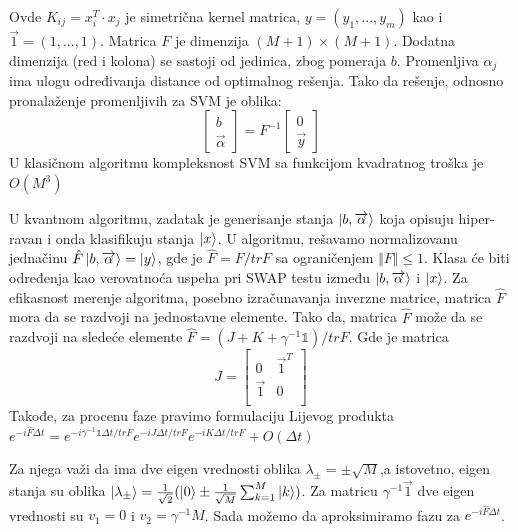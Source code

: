 \documentclass[12pt, letterpaper, oneside]{article}
\begin{document}
Ovde $K_{ij} = x_i^T \cdot x_j$ je simetrična kernel matrica, $y = (y_1,...,y_m)$ kao i
$\overrightarrow{1} = (1,...,1)$. Matrica $F$ je dimenzija $(M+1)\times(M+1)$. Dodatna dimenzija (red i kolona) se sastoji od jedinica,
zbog pomeraja $b$. Promenljiva $\alpha_j$ ima ulogu određivanja distance od optimalnog rešenja. Tako da rešenje, odnosno pronalaženje promenljivih za SVM je oblika:
\[
    \begin{bmatrix}
        b \\
        \overrightarrow{\alpha}
    \end{bmatrix} =
    F^{-1} \begin{bmatrix}
        0 \\
        \overrightarrow{y}
    \end{bmatrix}
\]
U klasičnom algoritmu kompleksnost SVM sa funkcijom kvadratnog troška je $O(M^3)$ 

U kvantnom algoritmu, zadatak je generisanje stanja $\Ket{b,\overrightarrow{\alpha}}$ koja opisuju hiper-ravan i onda klasifikuju stanja
$\Ket{x}$. U algoritmu, rešavamo normalizovanu jednačinu $\hat{F}\Ket{b,\overrightarrow{\alpha}} = \Ket{y}$, gde je $\hat{F} = F/trF$ sa 
ograničenjem $\Vert F \Vert \leq 1$. Klasa će biti određenja kao verovatnoća uspeha pri SWAP testu između $\Ket{b,\overrightarrow{\alpha}}$ i
$\Ket{x}$. Za efikasnost merenje algoritma, posebno izračunavanja inverzne matrice, matrica $\hat{F}$ mora da se razdvoji na jednostavne elemente.
Tako da, matrica $\hat{F}$ može da se razdvoji na sledeće elemente $\hat{F} = (J+K+\gamma^{-1}\mathbb{1})/trF$. 
Gde je matrica
\[
    J = \begin{bmatrix}
        0 & \overrightarrow{1}^T \\
        \overrightarrow{1} & 0 \\
    \end{bmatrix}
\]
Takođe, za procenu faze pravimo formulaciju Lijevog produkta \\
$e^{-i\hat{F}\varDelta{t}} = e^{-i\gamma^{-1}\mathbb{1}\varDelta{t}/trF}e^{-iJ\varDelta{t}/trF}e^{-iK\varDelta{t}/trF} + O(\varDelta{t})$

Za njega važi da ima dve eigen vrednosti oblika $\lambda_{\pm} = \pm \sqrt{M}$,a istovetno, 
eigen stanja su oblika $\Ket{\lambda_{\pm}} = \frac{1}{\sqrt{2}}(\Ket{0} \pm \frac{1}{\sqrt{M}}\sum_{k=1}^M\Ket{k})$.
Za matricu $\gamma^{-1}\overrightarrow{1}$ dve eigen vrednosti su $v_1 = 0$ i $v_2 = \gamma^{-1}M$.
Sada možemo da aproksimiramo fazu za $e^{-i\hat{F}\varDelta{t}}$.
\end{document}
